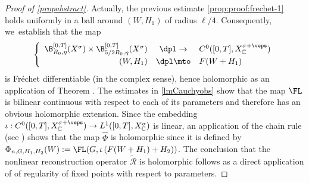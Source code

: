 \begin{proof}[Proof of \cref{propabstract}]
Actually, the previous estimate \eqref{prop:proof:frechet-1} holds uniformly in a ball around $(W, H_1)$ of radius $\ell/4$. Consequently, we~establish that the map
\begin{align*}
\left\{\begin{array}{rcl}
\B_{R_{0}, \eta}^{[0,T]}(X^{\sigma}) \times \B_{5/2R_{0}, \eta}^{[0,T]}(X^{\sigma}) &\dpl\to& C^0([0, T], X_\mathbb{C}^{\sigma+\veps})\\[3pt]
(W, H_1 )&\dpl\mto& F(W+H_1)
\end{array}\right.
\end{align*}
is Fréchet differentiable (in the complex sense), hence holomorphic as an application of Theorem \cite[Th.\,13.16]{Muj86}. The estimates in \cref{lmCauchyobs} show that the map $\FL$ is bilinear continuous with respect to each of its parameters and therefore has an obvious holomorphic extension. Since the embedding $\iota: C^0([0,T],X_{\mathbb{C}}^{\sigma+\veps})\to L^1([0,T],X_{\mathbb{C}}^{\sigma})$ is linear, an application of the chain rule (see \cite[Th.\,13.6]{Muj86}) shows that the map $\widehat{\Phi}$ is holomorphic since it is defined by $\Phi_{n,G,H_{1},H_{2}}(W):=\FL (G,\iota\left(F(W+H_{1})+H_{2}\right)) $. The conclusion that the nonlinear reconstruction operator $\mathcal{\widetilde{R}}$ is holomorphic follows as a direct application of \cite[Th.\,2.2]{1982:chow-hale:bifurcation-theory} of regularity of fixed points with respect to parameters.
\end{proof}


